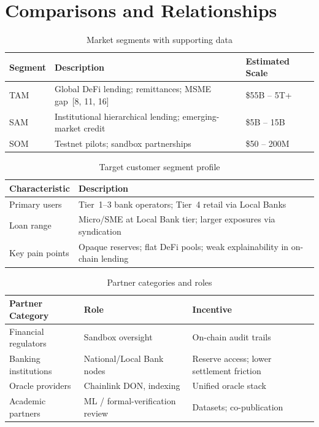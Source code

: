 \documentclass[12pt, a4paper]{report}
\newcommand{\tableheadcolor}{\rowcolor{TableHeadBg}}
\begin{document}
\section{Comparisons and Relationships}
\label{sec:comparisons-relationships}

\begin{table}[H]
\centering
\caption[Market segments with supporting data]{Market segments with supporting data}
\label{tab:market-sizing-ch5}
\begin{tabular}{p{3.5cm}p{6.5cm}p{3cm}}
\toprule
\tableheadcolor
\textbf{Segment} & \textbf{Description} & \textbf{Estimated Scale} \\
\midrule
TAM & Global DeFi lending; remittances; MSME gap~[8, 11, 16] & \$55B -- 5T+ \\
SAM & Institutional hierarchical lending; emerging-market credit & \$5B -- 15B \\
SOM & Testnet pilots; sandbox partnerships & \$50 -- 200M \\
\bottomrule
\end{tabular}
\end{table}

\vspace{2pt}

\begin{table}[H]
\centering
\caption[Target customer segment profile]{Target customer segment profile}
\label{tab:customer-segment-ch5}
\begin{tabular}{p{3.5cm}p{10cm}}
\toprule
\tableheadcolor
\textbf{Characteristic} & \textbf{Description} \\
\midrule
Primary users & Tier~1--3 bank operators; Tier~4 retail via Local Banks \\
Loan range & Micro/SME at Local Bank tier; larger exposures via syndication \\
Key pain points & Opaque reserves; flat DeFi pools; weak explainability in on-chain lending \\
\bottomrule
\end{tabular}
\end{table}

\vspace{2pt}

\begin{table}[H]
\centering
\caption[Partner categories and roles]{Partner categories and roles}
\label{tab:partner-categories-ch5}
\begin{tabular}{p{3.5cm}p{4.5cm}p{5.5cm}}
\toprule
\tableheadcolor
\textbf{Partner Category} & \textbf{Role} & \textbf{Incentive} \\
\midrule
Financial regulators & Sandbox oversight & On-chain audit trails \\
Banking institutions & National/Local Bank nodes & Reserve access; lower settlement friction \\
Oracle providers & Chainlink DON, indexing & Unified oracle stack \\
Academic partners & ML / formal-verification review & Datasets; co-publication \\
\bottomrule
\end{tabular}
\end{table}
\end{document}
